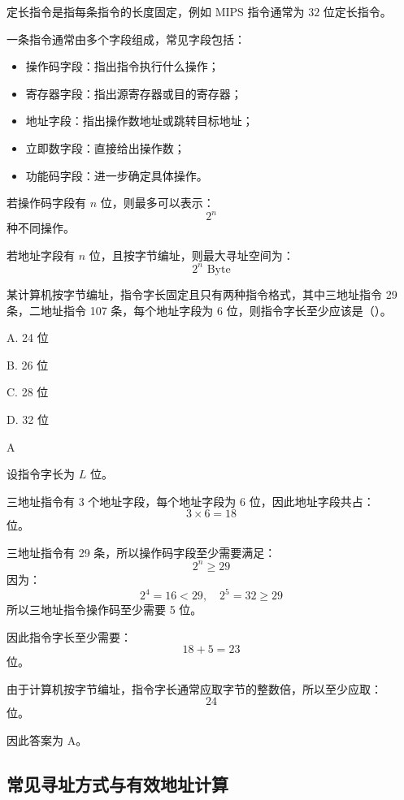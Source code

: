 \begin{knowledge}
定长指令是指每条指令的长度固定，例如 MIPS 指令通常为 $32$ 位定长指令。

一条指令通常由多个字段组成，常见字段包括：
\begin{itemize}
    \item 操作码字段：指出指令执行什么操作；
    \item 寄存器字段：指出源寄存器或目的寄存器；
    \item 地址字段：指出操作数地址或跳转目标地址；
    \item 立即数字段：直接给出操作数；
    \item 功能码字段：进一步确定具体操作。
\end{itemize}

若操作码字段有 $n$ 位，则最多可以表示：
\[
2^n
\]
种不同操作。

若地址字段有 $n$ 位，且按字节编址，则最大寻址空间为：
\[
2^n\text{ Byte}
\]
\end{knowledge}

\begin{question}
某计算机按字节编址，指令字长固定且只有两种指令格式，其中三地址指令 29 条，二地址指令 107 条，每个地址字段为 6 位，则指令字长至少应该是（）。

A. 24 位

B. 26 位

C. 28 位

D. 32 位
\end{question}

\begin{answer}
A
\end{answer}

\begin{analysisenv}
设指令字长为 $L$ 位。

三地址指令有 3 个地址字段，每个地址字段为 6 位，因此地址字段共占：
\[
3 \times 6 = 18
\]
位。

三地址指令有 29 条，所以操作码字段至少需要满足：
\[
2^n \ge 29
\]
因为：
\[
2^4=16<29,\quad 2^5=32\ge 29
\]
所以三地址指令操作码至少需要 5 位。

因此指令字长至少需要：
\[
18+5=23
\]
位。

由于计算机按字节编址，指令字长通常应取字节的整数倍，所以至少应取：
\[
24
\]
位。

因此答案为 A。
\end{analysisenv}


\subsection{常见寻址方式与有效地址计算}


